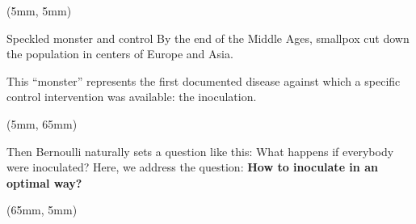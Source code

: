 \begin{frame}{}
    \begin{textblock*}{55mm}(5mm, 5mm)
        \begin{beamerboxesrounded}{Speckled monster and control}
                By the end of the Middle Ages, smallpox cut down the
            population in centers of Europe and Asia.

                This  ``monster'' represents the first documented
            disease against which a specific control intervention was
            available: the inoculation.
        \end{beamerboxesrounded}
    \end{textblock*}
%
    \begin{textblock*}{115mm}(5mm, 65mm)
        \begin{beamerboxesrounded}{}
            Then Bernoulli naturally sets a question like this: What
            happens if everybody were inoculated? Here, we address the
            question: \textbf{How to  inoculate in an optimal way?}
        \end{beamerboxesrounded}
    \end{textblock*}
%
    \begin{textblock*}{60mm}(65mm, 5mm)
        \begin{bibunit}[apalike]
            \nocite{bradley1971smallpox, Foppa2017}
            \putbib
        \end{bibunit}
    \end{textblock*}
\end{frame}
%
